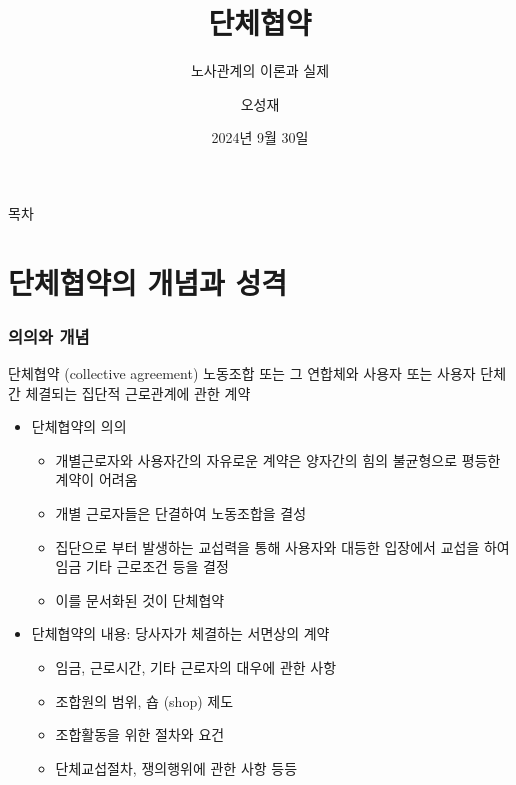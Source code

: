 \documentclass[aspectratio=169,xcolor=dvipsnames,handout]{beamer}
\title{단체협약}
\subtitle{노사관계의 이론과 실제}
\author{오성재}
\institute[CNU]
{\relax
    충남대학교 경제학과\\
}
\date{2024년 9월 30일}
\begin{document}

\frame{\titlepage}

\begin{frame}{목차}
    \small
    \tableofcontents[hideallsubsections]
\end{frame}

\section{단체협약의 개념과 성격}

\begin{frame}[allowframebreaks]
    \frametitle{의의와 개념}
    \begin{block}{단체협약 (collective agreement)}
        노동조합 또는 그 연합체와 사용자 또는 사용자 단체간 체결되는 집단적 근로관계에 관한 계약 
    \end{block}
    \begin{itemize}[<+->]
        \item 단체협약의 의의
        \begin{itemize}[<+->]
            \item 개별근로자와 사용자간의 자유로운 계약은 양자간의 힘의 불균형으로 평등한 계약이 어려움
            \item 개별 근로자들은 단결하여 노동조합을 결성
            \item 집단으로 부터 발생하는 교섭력을 통해 사용자와 대등한 입장에서 교섭을 하여 임금 기타 근로조건 등을 결정 
            \item 이를 문서화된 것이 단체협약
        \end{itemize}
    \framebreak\relax
    \item 단체협약의 내용: 당사자가 체결하는 서면상의 계약
        \begin{itemize}[<+->]
            \item 임금, 근로시간, 기타 근로자의 대우에 관한 사항 
            \item 조합원의 범위, 숍 (shop) 제도 
            \item 조합활동을 위한 절차와 요건
            \item 단체교섭절차, 쟁의행위에 관한 사항 등등
        \end{itemize}
    \end{itemize}
\end{frame}
\end{document}
